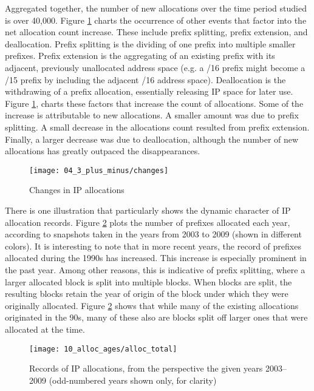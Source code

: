 Aggregated together, the number of new allocations over the time period
studied is over 40,000. Figure \ref{fig:IP allocations new and gone} charts
the occurrence of other events that factor into the net allocation count
increase. These include prefix splitting, prefix extension, and deallocation.
Prefix splitting is the dividing of one prefix into multiple smaller prefixes.
Prefix extension is the aggregating of an existing prefix with its adjacent,
previously unallocated address space (e.g. a /16 prefix might become a /15
prefix by including the adjacent /16 address space). Deallocation is the
withdrawing of a prefix allocation, essentially releasing IP space for later
use. Figure \ref{fig:IP allocations new and gone}, charts these factors that
increase the count of allocations. Some of the increase is attributable to new
allocations. A smaller amount was due to prefix splitting. A small decrease in
the allocations count resulted from prefix extension. Finally, a larger
decrease was due to deallocation, although the number of new allocations has
greatly outpaced the disappearances.

\begin{figure}[htbp]
    \centering
        \texttt{[image: 04\_3\_plus\_minus/changes]}
    \caption{Changes in IP allocations}
    \label{fig:IP allocations new and gone}
\end{figure}

There is one illustration that particularly shows the dynamic character of IP
allocation records. Figure \ref{fig:alloc ages total} plots the number of
prefixes allocated each year, according to snapshots taken in the years from
2003 to 2009 (shown in different colors). It is interesting to note that in
more recent years, the record of prefixes allocated during the 1990s has
increased. This increase is especially prominent in the past year. Among other
reasons, this is indicative of prefix splitting, where a larger allocated
block is split into multiple blocks. When blocks are split, the resulting
blocks retain the year of origin of the block under which they were originally
allocated. Figure \ref{fig:alloc ages total} shows that while many of the
existing allocations originated in the 90s, many of these also are blocks
split off larger ones that were allocated at the time.

\begin{figure}[htbp]
	\centering
		\texttt{[image: 10\_alloc\_ages/alloc\_total]}
	\caption{Records of IP allocations, from the perspective the given years
		     2003--2009 (odd-numbered years shown only, for clarity)}
	\label{fig:alloc ages total}
\end{figure}


